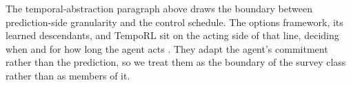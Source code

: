 The temporal-abstraction paragraph above draws the boundary between prediction-side granularity and the control schedule. The options framework, its learned descendants, and TempoRL sit on the acting side of that line, deciding when and for how long the agent acts \citep{sutton1999options,bacon2017optioncritic,biedenkapp2021temporl}. They adapt the agent's commitment rather than the prediction, so we treat them as the boundary of the survey class rather than as members of it.

